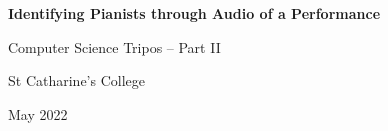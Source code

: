 \documentclass[crop=false]{standalone}
\begin{document}
\begin{titlepage}
  \thispagestyle{titlepagestyle}
  \centering

  \vspace*{4cm}

  {\LARGE \textbf{Identifying Pianists through Audio of a Performance} \par}

  \vspace{1cm}

  {\Large Computer Science Tripos -- Part II \par}

  \vspace{0.75cm}
  
  {\Large St Catharine's College \par}

  \vspace{0.75cm}

  {\Large May 2022 \par}

\end{titlepage}
    
\end{document}
